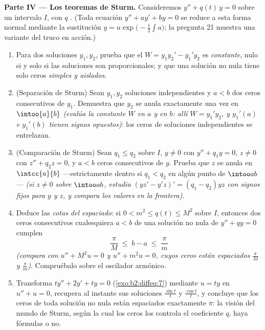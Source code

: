 \begin{problem}
\medskip
\noindent\textbf{Parte IV --- Los teoremas de Sturm.} Consideremos
$y'' + q(t)\,y = 0$ sobre un intervalo $I$, con $q$ .
(Toda ecuación $y'' + ay' + by = 0$ se reduce a esta forma normal
mediante la sustitución $y = u\exp\bigl(-\frac12\int a\bigr)$; la
pregunta 21 muestra una variante del truco en acción.)
\begin{enumerate}[resume]
  \item Para dos soluciones $y_1, y_2$, prueba que el  $W
        = y_1y_2' - y_1'y_2$ es \emph{constante}, nulo si y solo si
        las soluciones son proporcionales; y que una solución no
        nula tiene solo ceros \emph{simples y aislados}.
  \item (Separación de Sturm) Sean $y_1, y_2$ soluciones
        independientes y $a < b$ dos ceros consecutivos de $y_1$.
        Demuestra que $y_2$ se anula exactamente una vez en
        $\intoo{a}{b}$ \emph{(evalúa la constante $W$ en $a$ y en
        $b$: allí $W = y_1'y_2$, y $y_1'(a)$ e $y_1'(b)$ tienen
        signos opuestos)}: los ceros de soluciones independientes se
        entrelazan.
  \item (Comparación de Sturm) Sean $q_1 \leq q_2$ sobre $I$, $y
        \neq 0$ con $y'' + q_1y = 0$, $z \neq 0$ con $z'' + q_2z =
        0$, y $a < b$ ceros consecutivos de $y$. Prueba que $z$ se
        anula en $\intcc{a}{b}$ ---estrictamente dentro si $q_1 <
        q_2$ en algún punto de $\intoo ab$--- \emph{(si $z \neq 0$
        sobre $\intoo ab$, estudia $(yz' - y'z)' = (q_1 - q_2)yz$
        con signos fijos para $y$ y $z$, y compara los valores en la
        frontera)}.
  \item Deduce las \emph{cotas del espaciado}: si $0 < m^2 \leq q(t)
        \leq M^2$ sobre $I$, entonces dos ceros consecutivos
        cualesquiera $a < b$ de una solución no nula de $y'' + qy =
        0$ cumplen
        \[
        \frac{\pi}{M} \;\leq\; b - a \;\leq\; \frac{\pi}{m}
        \]
        \emph{(compara con $u'' + M^2u = 0$ y $u'' + m^2u = 0$,
        cuyos ceros están espaciados $\frac\pi M$ y $\frac\pi
        m$)}. Compruébalo sobre el oscilador armónico.
  \item Transforma $ty'' + 2y' + ty = 0$ (\cref{exo:b2:diffeq:7})
        mediante $u = ty$ en $u'' + u = 0$, recupera al instante sus
        soluciones $\frac{\sin t}t$ y $\frac{\cos t}{t}$, y concluye
        que los ceros de toda solución no nula están espaciados
        exactamente $\pi$: la visión del mundo de Sturm, según la
        cual los ceros los controla el coeficiente $q$, haya
        fórmulas o no.
\end{enumerate}


\end{problem}
